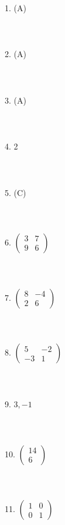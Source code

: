 \documentclass[fleqn]{article}
\begin{document}
1. (A) \\\\\\\\
2. (A) \\\\\\\\
3. (A) \\\\\\\\
4. 2 \\\\\\\\
5. (C) \\\\\\\\
6. \(\begin{pmatrix} 3 & 7 \\ 9 & 6 \end{pmatrix}\) \\\\\\\\
7. \(\begin{pmatrix} 8 & -4 \\ 2 & 6 \end{pmatrix}\) \\\\\\\\
8. \(\begin{pmatrix} 5 & -2 \\ -3 & 1 \end{pmatrix}\) \\\\\\\\
9. \(3, -1\) \\\\\\\\
10. \(\begin{pmatrix} 14 \\ 6 \end{pmatrix}\) \\\\\\\\
11. \(\begin{pmatrix} 1 & 0 \\ 0 & 1 \end{pmatrix}\) \\\\\\\\
\end{document}
